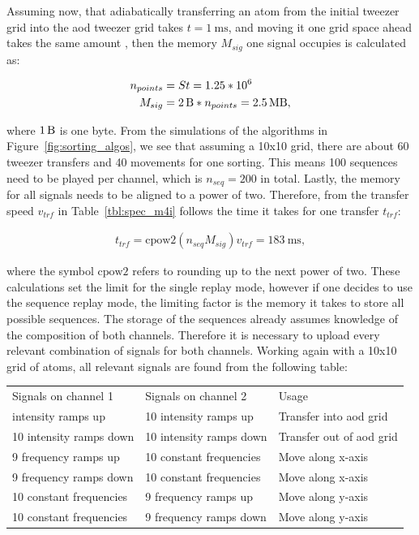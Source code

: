Assuming now, that adiabatically transferring an atom from the initial tweezer grid into the \ac{aod} tweezer grid takes $t=\SI{1}{\milli\second}$, and moving it one grid space ahead takes the same amount , then the memory $M_{sig}$ one signal occupies is calculated as:

\begin{align}
	n_{points} &= S t = 1.25 * 10^6 \\
	M_{sig} &= \SI{2}{\byte} * n_{points} = \SI{2.5}{\mega\byte},
\end{align}

where $\SI{1}{\byte}$ is one byte. From the simulations of the algorithms in Figure~\ref{fig:sorting_algos}, we see that assuming a 10x10 grid, there are about 60 tweezer transfers and 40 movements for one sorting. This means 100 sequences need to be played per channel, which is $n_{seq}=200$ in total. Lastly, the memory for all signals needs to be aligned to a power of two. Therefore, from the transfer speed $v_{trf}$ in Table~\ref{tbl:spec_m4i} follows the time it takes for one transfer $t_{trf}$:

\begin{align}
	t_{trf} = \textrm{cpow2}(n_{seq} M_{sig}) v_{trf} = \SI{183}{\milli\second},
\end{align}

where the symbol $\textrm{cpow2}$ refers to rounding up to the next power of two.
These calculations set the limit for the single replay mode, however if one decides to use the sequence replay mode, the limiting factor is the memory it takes to store all possible sequences. The storage of the sequences already assumes knowledge of the composition of both channels. Therefore it is necessary to upload every relevant combination of signals for both channels. Working again with a 10x10 grid of atoms, all relevant signals are found from the following table:

\begin{table}[h!]
\label{tbl:eom_crystals}
\centering
\begin{tabular}{l|l|l}
	\hline \hline
		Signals on channel 1 & Signals on channel 2 & Usage \\ \thickhline
		10 intensity ramps up & 10 intensity ramps up & Transfer into \ac{aod} grid \\
		10 intensity ramps down & 10 intensity ramps down & Transfer out of \ac{aod} grid \\
		9 frequency ramps up & 10 constant frequencies & Move along x-axis \\
		9 frequency ramps down & 10 constant frequencies & Move along x-axis \\
		10 constant frequencies & 9 frequency ramps up & Move along y-axis \\
		10 constant frequencies & 9 frequency ramps down & Move along y-axis \\
	\hline \hline
\end{tabular}
\end{table}

